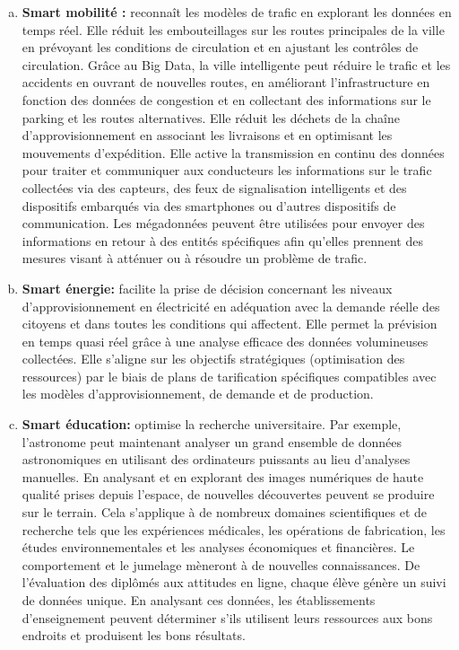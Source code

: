 \documentclass[french, a4paper, 12pt]{report}
\begin{document}
\begin{enumerate}[a.]
\item \textbf{Smart mobilité :} reconnaît les modèles de trafic en explorant les données en temps réel. 
Elle réduit les embouteillages sur les routes principales de la ville en prévoyant les conditions de circulation et en ajustant les contrôles de circulation. Grâce au Big Data, la ville intelligente peut réduire le trafic et les accidents en ouvrant de nouvelles routes, en améliorant l'infrastructure en fonction des données de congestion et en collectant des informations sur le parking et les routes alternatives.
Elle réduit les déchets de la chaîne d'approvisionnement en associant les livraisons et en optimisant les mouvements d'expédition.
Elle active la transmission en continu des données pour traiter et communiquer aux conducteurs les informations sur le trafic collectées via des capteurs, des feux de signalisation intelligents et des dispositifs embarqués via des smartphones ou d'autres dispositifs de communication.
Les mégadonnées peuvent être utilisées pour envoyer des informations en retour à des entités spécifiques afin qu’elles prennent des mesures visant à atténuer ou à résoudre un problème de trafic.\\

\item \textbf{Smart énergie:} facilite la prise de décision concernant les niveaux d'approvisionnement en électricité en adéquation avec la demande réelle des citoyens et dans toutes les conditions qui affectent.
Elle permet la prévision en temps quasi réel grâce à une analyse efficace des données volumineuses collectées.
Elle s’aligne sur les objectifs stratégiques (optimisation des ressources) par le biais de plans de tarification spécifiques compatibles avec les modèles d'approvisionnement, de demande et de production.\\

\item \textbf{Smart éducation:} optimise la recherche universitaire. Par exemple, l'astronome peut maintenant analyser un grand ensemble de données astronomiques en utilisant des ordinateurs puissants au lieu d'analyses manuelles. En analysant et en explorant des images numériques de haute qualité prises depuis l'espace, de nouvelles découvertes peuvent se produire sur le terrain. Cela s'applique à de nombreux domaines scientifiques et de recherche tels que les expériences médicales, les opérations de fabrication, les études environnementales et les analyses économiques et financières.
Le comportement et le jumelage mèneront à de nouvelles connaissances. De l'évaluation des diplômés aux attitudes en ligne, chaque élève génère un suivi de données unique. En analysant ces données, les établissements d’enseignement peuvent déterminer s’ils utilisent leurs ressources aux bons endroits et produisent les bons résultats.\\


\end{enumerate}
\end{document}
